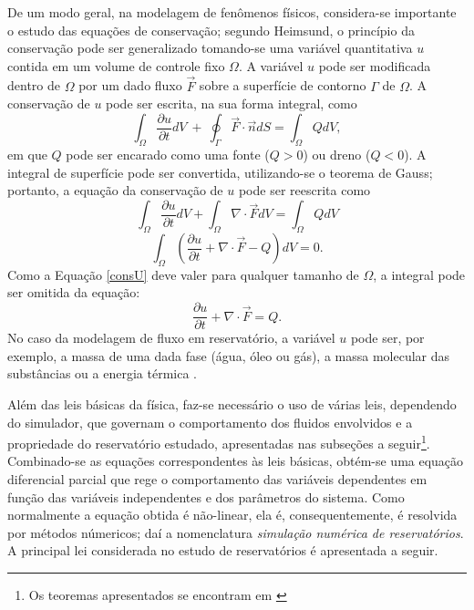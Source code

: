 De um modo geral, na modelagem de fen\^{o}menos f\'{i}sicos, considera-se importante o estudo das equa\c{c}\~{o}es de conserva\c{c}\~{a}o; segundo Heimsund, o princ\'{i}pio da conserva\c{c}\~{a}o pode ser generalizado tomando-se uma vari\'{a}vel quantitativa $u$ contida em um volume de controle fixo $\Omega$. A vari\'{a}vel $u$ pode ser modificada dentro de $\Omega$ por um dado fluxo $\vec{F}$ sobre a superf\'{i}cie de contorno $\Gamma$ de $\Omega$. A conserva\c{c}\~{a}o de $u$ pode ser escrita, na sua forma integral, como
\begin{equation}
	\int_{\Omega} \frac{\partial u}{\partial t}dV ~+~\oint_{\Gamma}\vec{F}\cdot\vec{n}dS = \int_{\Omega} Q dV,
\end{equation}
em que $Q$ pode ser encarado como uma fonte ($Q > 0$) ou dreno ($Q < 0$). A integral de superf\'{i}cie pode ser convertida, utilizando-se o teorema de Gauss; portanto, a equa\c{c}\~{a}o da conserva\c{c}\~{a}o de $u$ pode ser reescrita como
\begin{equation}
\int_{\Omega} \frac{\partial u}{\partial t}dV + \int_{\Omega} \nabla\cdot\vec{F} dV = \int_{\Omega}Q dV
\end{equation}
\begin{equation}\label{consU}
\int_{\Omega} \left(\frac{\partial u}{\partial t} + \nabla\cdot\vec{F} - Q \right)dV = 0.
\end{equation}
Como a Equa\c{c}\~{a}o \eqref{consU} deve valer para qualquer tamanho de $\Omega$, a integral pode ser omitida da equa\c{c}\~{a}o:
\begin{equation}\label{consU2}
\frac{\partial u}{\partial t} + \nabla\cdot\vec{F} = Q.
\end{equation}
No caso da modelagem de fluxo em reservat\'{o}rio, a vari\'{a}vel $u$ pode ser, por exemplo, a massa de uma dada fase (\'{a}gua, \'{o}leo ou g\'{a}s), a massa molecular das subst\^{a}ncias ou a energia t\'{e}rmica \cite{heimsund2005}.

Al\'{e}m das leis b\'{a}sicas da f\'{i}sica, faz-se necess\'{a}rio o uso de v\'{a}rias leis, dependendo do simulador, que governam o comportamento dos fluidos envolvidos e a propriedade do reservat\'{o}rio estudado, apresentadas nas subse\c{c}\~{o}es a seguir\footnote{Os teoremas apresentados se encontram em \cite[pp. 520-522]{engres}}. Combinado-se as equa\c{c}\~{o}es correspondentes \`{a}s leis b\'{a}sicas, obt\'{e}m-se uma equa\c{c}\~{a}o diferencial parcial que rege o comportamento das vari\'{a}veis dependentes em fun\c{c}\~{a}o das vari\'{a}veis independentes e dos par\^{a}metros do sistema. Como normalmente a equa\c{c}\~{a}o obtida \'{e} n\~{a}o-linear, ela \'{e}, consequentemente, \'{e} resolvida por m\'{e}todos n\'{u}mericos; da\'{i} a nomenclatura \textit{simula\c{c}\~{a}o num\'{e}rica de reservat\'{o}rios}. A principal lei considerada no estudo de reservat\'{o}rios \'{e} apresentada a seguir. 

